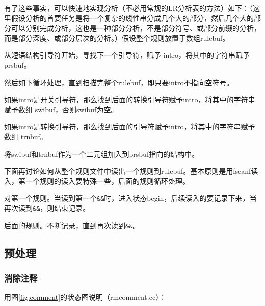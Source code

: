 \documentclass{article}
\begin{document}
\begin{CJK}{UTF8}{gbsn}
有了这些事实，可以快速地实现分析（不必用常规的LR分析表的方法）如下：（这里假设分析的首要任务是将一个复杂的线性串分成几个大的部分，然后几个大的部分可以分别完成分析，这也是一种部分分析，不是部分符号、或部分前缀的分析，而是部分深度、或部分层次的分析。）假设整个规则放置于数组rulebuf。
\begin{itemize*}
\item 从短语结构引导符开始，寻找下一个引导符，赋予 intro，将其中的字符串赋予prsbuf。
\item 然后如下循环处理，直到扫描完整个rulebuf，即只要intro不指向空符号。
\begin{itemize*}
\item 如果intro是开关引导符，那么找到后面的转换引导符赋予intro，将其中的字符串赋予数组 swibuf，否则swibuf为空。
\item 如果intro是转换引导符，那么找到后面的引导符赋予intro，将其中的字符串赋予数组 trnbuf。
\item 将swibuf和trnbuf作为一个二元组加入到prsbuf指向的结构中。
\end{itemize*}
\end{itemize*}

下面再讨论如何从整个规则文件中读出一个规则到rulebuf。基本原则是用fscanf读入，第一个规则的读入要特殊一些，后面的规则循环处理。
\begin{itemize*}
\item 对第一个规则。当读到第一个\verb|&&|时，进入状态begin，后续读入的要记录下来，当再次读到\verb|&&|，则结束记录。
\item 后面的规则。不断记录，直到再次读到\verb|&&|。
\end{itemize*}

\subsection{预处理}

\subsubsection{消除注释}

用图\ref{fig:comment}的状态图说明（rmcomment.cc）：

\begin{figure}
\begin{center}
\end{center}
\end{figure}
\end{CJK}
\end{document}
